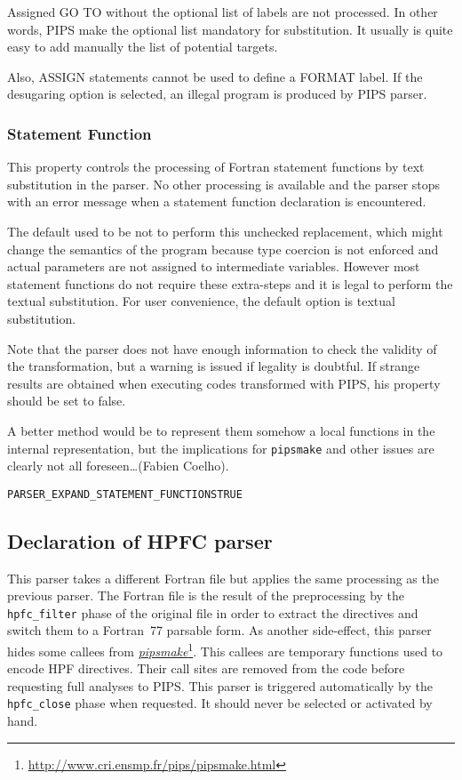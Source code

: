 \documentclass[a4paper]{report}
\newenvironment{PipsProp}{\begin{alltt}}{\end{alltt}}
\newcommand{\LINK}[2]{\href{#2}{#1}\footnote{\url{#2}}\xspace}
\newcommand{\PIPSMAKE}{\LINK{\emph{pipsmake}}{http://www.cri.ensmp.fr/pips/pipsmake.html}\xspace}
\begin{document}
Assigned GO TO without the optional list of labels are not processed. In
other words, PIPS make the optional list mandatory for substitution. It
usually is quite easy to add manually the list of potential targets.

Also, ASSIGN statements cannot be used to define a FORMAT label. If the
desugaring option is selected, an illegal program is produced by PIPS
parser.

\subsubsection*{Statement Function}

This property controls the processing of Fortran statement functions by text
substitution in the parser. No other processing is available and the
parser stops with an error message when a statement function declaration
is encountered.

The default used to be not to perform this unchecked replacement, which might
change the semantics of the program because type coercion is not enforced
and actual parameters are not assigned to intermediate variables.
However most statement functions do not require these extra-steps and it
is legal to perform the textual substitution. For user convenience, the
default option is textual substitution.

Note that the parser does not have enough information to check the validity
of the transformation, but a warning is issued if legality is doubtful. If
strange results are obtained when executing codes transformed with PIPS,
his property should be set to false.

A better method would be to represent them somehow a local functions in
the internal representation, but the implications for \texttt{pipsmake}
and other issues are clearly not all foreseen\ldots (Fabien Coelho).

\begin{PipsProp}
PARSER_EXPAND_STATEMENT_FUNCTIONS TRUE
\end{PipsProp}


\subsection{Declaration of HPFC parser}

This parser takes a different Fortran file but applies the same
processing as the previous parser. The Fortran file is the result of the
preprocessing by the \verb|hpfc_filter| phase of the original file in
order to extract the directives and switch them to a Fortran~77 parsable
form. As another side-effect, this parser hides some callees from
\PIPSMAKE. This callees are temporary functions used to encode HPF
directives. Their call sites are removed from the code before requesting full analyses
to PIPS. This parser is triggered automatically by the \verb|hpfc_close|
phase when requested. It should never be selected or activated by hand.
\end{document}
